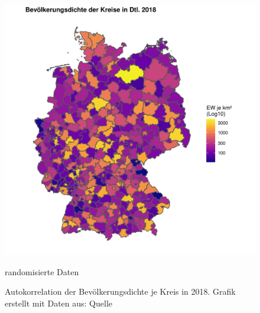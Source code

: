 \begin{figure}[htb]
\begin{minipage}[b]{.45\linewidth}
       \includegraphics[width=\linewidth,trim={2cm 1cm 1cm 1cm},clip]{body/figures/popdens2018-rdm.pdf}
       \caption{randomisierte Daten}
    \end{minipage}
    \caption[Bevölkerungsdichten ]{Autokorrelation der Bevölkerungsdichte je Kreis in 2018. Grafik erstellt mit Daten aus: Quelle}
    \label{fig_densitymaps}
 \end{figure}

